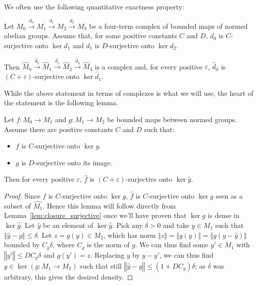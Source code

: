 We often use the following quantitative exactness property:

\begin{proposition}\label{prop:completeexact}
Let $M_0\xrightarrow{d_0} M_1\xrightarrow{d_1} M_2\xrightarrow{d_2} M_3$ be a
four-term complex of bounded maps of normed abelian groups. Assume that, for
some positive constants $C$ and $D$, $d_0$ is $C$-surjective onto $\ker d_1$
and $d_1$ is $D$-surjective onto $\ker d_2$.

Then
$\widehat{M}_0\xrightarrow{\widehat{d}_0} \widehat{M}_1\xrightarrow{\widehat{d}_1} \widehat{M}_2\xrightarrow{\widehat{d}_2} \widehat{M}_3$
is a complex and, for every positive $ε$, $\widehat{d}_0$ is $(C + ε)$-surjective
onto $\ker \widehat{d}_1$.
\end{proposition}

While the above statement in terms of complexes is what we will use,
the heart of the statement is the following lemma.

\begin{lemma}\label{lem:controlled_exactness}
  \leanok
  Let $f : M_0 → M_1$ and $g : M_1 → M_2$ be bounded maps between normed groups.
  Assume there are positive constants $C$ and $D$ such that:
  \begin{itemize}
    \item
      $f$ is $C$-surjective onto $\ker g$.
    \item
      $g$ is $D$-surjective onto its image.
  \end{itemize}
  Then for every positive $ε$, $\widehat{f}$ is $(C + ε)$-surjective onto
  $\ker \widehat{g}$.
\end{lemma}

\begin{proof}\leanok
  Since $f$ is $C$-surjective onto $\ker g$, $\widehat{f}$ is $C$-surjective
  onto $\ker g$ seen as a subset of $\widehat{M_1}$. Hence this lemma will
  follow directly from Lemma~\ref{lem:closure_surjective}
  once we'll have proven that $\ker g$ is dense in $\ker \widehat{g}$.
  Let $\widehat y$ be an element of $\ker \widehat{g}$.
  Pick any $\delta > 0$ and take $y\in M_1$ such that
  $‖\widehat{y}-y‖\leq \delta$. Let $z=g(y)\in M_2$, which has norm
  $‖z‖=‖g(y)‖=‖g(y-\widehat{y})‖$ bounded by
  $C_{g}\delta$, where $C_{g}$ is the norm of $g$. We can thus find some
  $y'\in M_1$ with $‖y'‖\leq DC_{g}\delta$ and $g(y')=z$. Replacing $y$ by
  $y-y'$, we can thus find $y\in \ker(g: M_1\to M_2)$ such that still
  $‖\widehat{y}-y‖\leq (1+DC_{g})\delta$; as $\delta$ was arbitrary, this
  gives the desired density.
\end{proof}

